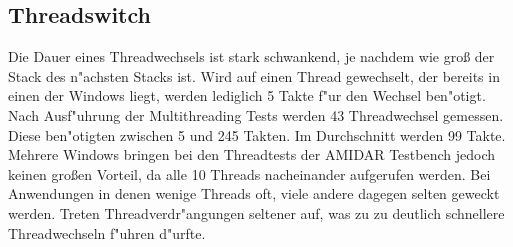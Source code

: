 \subsection{Threadswitch}
Die Dauer eines Threadwechsels ist stark schwankend, je nachdem wie groß der Stack des n"achsten Stacks ist. Wird auf einen Thread gewechselt, der bereits in einen der Windows liegt, werden lediglich 5 Takte f"ur den Wechsel ben"otigt. Nach Ausf"uhrung der Multithreading Tests werden 43 Threadwechsel gemessen. Diese ben"otigten zwischen 5 und 245 Takten. Im Durchschnitt werden 99 Takte. Mehrere Windows bringen bei den Threadtests der AMIDAR Testbench jedoch keinen großen Vorteil, da alle 10 Threads nacheinander aufgerufen werden. Bei Anwendungen in denen wenige Threads oft, viele andere dagegen selten geweckt werden. Treten Threadverdr"angungen seltener auf, was zu zu deutlich schnellere Threadwechseln f"uhren d"urfte. 

